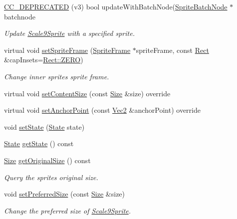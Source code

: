 \begin{DoxyCompactItemize}
\hyperlink{classui_1_1Scale9Sprite_a88772a231a9cf4f4acfa08e745dc560f}{C\+C\+\_\+\+D\+E\+P\+R\+E\+C\+A\+T\+ED} (v3) bool update\+With\+Batch\+Node(\hyperlink{classSpriteBatchNode}{Sprite\+Batch\+Node} $\ast$batchnode
\begin{DoxyCompactList}\small\item\em Update \hyperlink{classui_1_1Scale9Sprite}{Scale9\+Sprite} with a specified sprite. \end{DoxyCompactList}\item 
virtual void \hyperlink{classui_1_1Scale9Sprite_a296c3b8369428727173c2e8b3dcad00a}{set\+Sprite\+Frame} (\hyperlink{classSpriteFrame}{Sprite\+Frame} $\ast$sprite\+Frame, const \hyperlink{classRect}{Rect} \&cap\+Insets=\hyperlink{classRect_a590be46e60027b2ca0f62a457f91a83e}{Rect\+::\+Z\+E\+RO})
\begin{DoxyCompactList}\small\item\em Change inner sprite\textquotesingle{}s sprite frame. \end{DoxyCompactList}\item 
virtual void \hyperlink{classui_1_1Scale9Sprite_af7a55ebc4ba4b0da9ce2ce34bb3bda37}{set\+Content\+Size} (const \hyperlink{classSize}{Size} \&size) override
\item 
virtual void \hyperlink{classui_1_1Scale9Sprite_a7153fb170a630efc0748e0db6678963f}{set\+Anchor\+Point} (const \hyperlink{classVec2}{Vec2} \&anchor\+Point) override
\item 
void \hyperlink{classui_1_1Scale9Sprite_a511b07afa3ccc53fbd2e33f0dca78e8c}{set\+State} (\hyperlink{classui_1_1Scale9Sprite_a6580c2817c63b7a2461c48378b199d79}{State} state)
\item 
\hyperlink{classui_1_1Scale9Sprite_a6580c2817c63b7a2461c48378b199d79}{State} \hyperlink{classui_1_1Scale9Sprite_a40c18c08c008a74031f25dd296e0e560}{get\+State} () const
\item 
\hyperlink{classSize}{Size} \hyperlink{classui_1_1Scale9Sprite_a11b3114a2b81650e5e1ab153fef7eaaa}{get\+Original\+Size} () const
\begin{DoxyCompactList}\small\item\em Query the sprite\textquotesingle{}s original size. \end{DoxyCompactList}\item 
void \hyperlink{classui_1_1Scale9Sprite_a9e5d4a2ad1a4caa99335029fb7d17762}{set\+Preferred\+Size} (const \hyperlink{classSize}{Size} \&size)
\begin{DoxyCompactList}\small\item\em Change the preferred size of \hyperlink{classui_1_1Scale9Sprite}{Scale9\+Sprite}. \end{DoxyCompactList}\item 

\end{DoxyCompactItemize}

